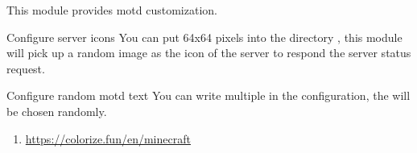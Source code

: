 This module provides motd customization.

\begin{example}{Configure server icons}
    You can put 64x64 pixels  into the directory , this module will pick up a random image as the icon of the server to respond the server status request.
\end{example}

\begin{example}{Configure random motd text}
    You can write multiple  in the configuration, the  will be chosen randomly.
\end{example}

\begin{enumerate}
    \item \url{https://colorize.fun/en/minecraft}
\end{enumerate}
